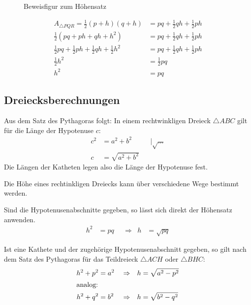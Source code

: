 \begin{bew}[Ergänzungsbeweis]
\begin{figure}
\begin{center}
\end{center}
\caption{Beweisfigur zum Höhensatz}
\label{abb:bewHSatz}
\end{figure}
\begin{align*}
 A_{\triangle PQR} = \frac{1}{2} (p+h)(q+h) &= pq + \frac{1}{2}qh + \frac{1}{2}ph \\
                     \frac{1}{2} \left(pq +ph +qh + h^2\right) &= pq + \frac{1}{2}qh + \frac{1}{2}ph \\
                     \frac{1}{2} pq + \frac{1}{2} ph + \frac{1}{2} qh + \frac{1}{2} h^2 &= pq + \frac{1}{2}qh + \frac{1}{2}ph \\
                     \frac{1}{2} h^2 &= \frac{1}{2} pq \\
                     h^2 &= pq
\end{align*}

\end{bew}

\subsection{Dreiecksberechnungen}

\begin{folg}
 Aus dem Satz des Pythagoras folgt: In einem rechtwinkligen Dreieck \(\triangle ABC\) gilt für die Länge der Hypotenuse \(c\):
 \begin{align*}
  c^2 &= a^2 + b^2 &&|\sqrt{\ldots}\\
  c &= \sqrt{a^2 + b^2}
 \end{align*}
 Die Längen der Katheten legen also die Länge der Hypotenuse fest.
\end{folg}

\begin{folg}
 Die Höhe eines rechtinkligen Dreiecks kann über verschiedene Wege bestimmt werden.
 
 Sind die Hypotenusenabschnitte gegeben, so lässt sich direkt der Höhensatz anwenden.
 \begin{align*}
  h^2 &= pq & &\Rightarrow & h &=\sqrt{pq}
 \end{align*}
 
 Ist eine Kathete und der zugehörige Hypotenusenabschnitt gegeben, so gilt nach dem Satz des Pythagoras für das Teildreieck \(\triangle ACH\) oder \(\triangle BHC\):
 \begin{align*}
  h^2 + p^2 &= a^2 & &\Rightarrow& h &=\sqrt{a^2-p^2} \\
  \intertext{analog:}
  h^2 + q^2 &= b^2 & &\Rightarrow& h &=\sqrt{b^2-q^2}
 \end{align*}
\end{folg}

